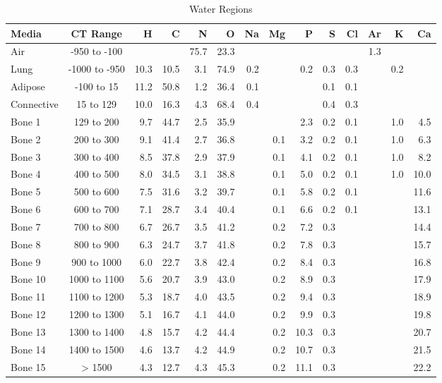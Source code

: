 \begin{sidewaystable}[ht]
\caption{Water Regions}
\centering 
\begin{tabular}{l c r r r r r r r r r r r r}
\hline \hline   
Media       & CT Range      & H    & C    & N    & O    & Na  & Mg  & P    & S   & Cl  & Ar  & K   & Ca \\ [0.5ex] 
\hline
Air         & -950 to -100  &      &      & 75.7 & 23.3 &     &     &      &     &     & 1.3 &     &      \\
Lung        & -1000 to -950 & 10.3 & 10.5 &  3.1 & 74.9 & 0.2 &     &  0.2 & 0.3 & 0.3 &     & 0.2 &      \\
Adipose     & -100 to 15    & 11.2 & 50.8 &  1.2 & 36.4 & 0.1 &     &      & 0.1 & 0.1 &     &     &      \\
Connective  & 15 to 129     & 10.0 & 16.3 &  4.3 & 68.4 & 0.4 &     &      & 0.4 & 0.3 &     &     &      \\
Bone 1      & 129 to 200    &  9.7 & 44.7 &  2.5 & 35.9 &     &     &  2.3 & 0.2 & 0.1 &     & 1.0 &  4.5 \\ 
Bone 2      & 200 to 300    &  9.1 & 41.4 &  2.7 & 36.8 &     & 0.1 &  3.2 & 0.2 & 0.1 &     & 1.0 &  6.3 \\ 
Bone 3      & 300 to 400    &  8.5 & 37.8 &  2.9 & 37.9 &     & 0.1 &  4.1 & 0.2 & 0.1 &     & 1.0 &  8.2 \\ 
Bone 4      & 400 to 500    &  8.0 & 34.5 &  3.1 & 38.8 &     & 0.1 &  5.0 & 0.2 & 0.1 &     & 1.0 & 10.0 \\ 
Bone 5      & 500 to 600    &  7.5 & 31.6 &  3.2 & 39.7 &     & 0.1 &  5.8 & 0.2 & 0.1 &     &     & 11.6 \\ 
Bone 6      & 600 to 700    &  7.1 & 28.7 &  3.4 & 40.4 &     & 0.1 &  6.6 & 0.2 & 0.1 &     &     & 13.1 \\ 
Bone 7      & 700 to 800    &  6.7 & 26.7 &  3.5 & 41.2 &     & 0.2 &  7.2 & 0.3 &     &     &     & 14.4 \\ 
Bone 8      & 800 to 900    &  6.3 & 24.7 &  3.7 & 41.8 &     & 0.2 &  7.8 & 0.3 &     &     &     & 15.7 \\ 
Bone 9      & 900 to 1000   &  6.0 & 22.7 &  3.8 & 42.4 &     & 0.2 &  8.4 & 0.3 &     &     &     & 16.8 \\ 
Bone 10     & 1000 to 1100  &  5.6 & 20.7 &  3.9 & 43.0 &     & 0.2 &  8.9 & 0.3 &     &     &     & 17.9 \\ 
Bone 11     & 1100 to 1200  &  5.3 & 18.7 &  4.0 & 43.5 &     & 0.2 &  9.4 & 0.3 &     &     &     & 18.9 \\ 
Bone 12     & 1200 to 1300  &  5.1 & 16.7 &  4.1 & 44.0 &     & 0.2 &  9.9 & 0.3 &     &     &     & 19.8 \\
Bone 13     & 1300 to 1400  &  4.8 & 15.7 &  4.2 & 44.4 &     & 0.2 & 10.3 & 0.3 &     &     &     & 20.7 \\
Bone 14     & 1400 to 1500  &  4.6 & 13.7 &  4.2 & 44.9 &     & 0.2 & 10.7 & 0.3 &     &     &     & 21.5 \\  
Bone 15     & > 1500        &  4.3 & 12.7 &  4.3 & 45.3 &     & 0.2 & 11.1 & 0.3 &     &     &     & 22.2 \\[1ex]
\hline
\end{tabular}
\label{table:ctmap}
\end{sidewaystable}


